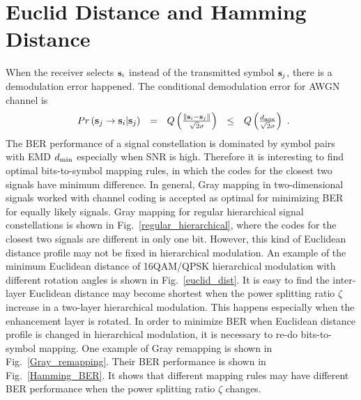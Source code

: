\documentclass[10pt,fleqn, twocolumn]{IEEEtran}
\newcommand{\bs}{{\bf s}}
\begin{document}
\section{Euclid Distance and Hamming Distance}
When the receiver selects $\bs_i$ instead of the transmitted
symbol $\bs_j$, there is a demodulation error happened. The
conditional demodulation error for AWGN channel is
\begin{equation}
\begin{array}{rcccl}
Pr\left(\bs_{j}\rightarrow\bs_{i}|\bs_{j}\right)&=&Q\left(\frac{\|\bs_{i}-\bs_{j}\|}{\sqrt{2}\sigma}\right)&\leq&Q\left(\frac{d_{\rm
min}}{\sqrt{2}\sigma}\right)
\end{array}.\label{prior_error}
\end{equation}
\noindent The BER performance of a signal constellation is
dominated by symbol pairs with EMD $d_{\rm min}$ especially when
SNR is high. Therefore it is interesting to find optimal
bits-to-symbol mapping rules, in which the codes for the closest
two signals have minimum difference. In general, Gray mapping in
two-dimensional signals worked with channel coding is accepted as
optimal for minimizing BER for equally likely signals. Gray
mapping for regular hierarchical signal constellations is shown in
Fig.~\ref{regular_hierarchical}, where the codes for the closest
two signals are different in only one bit.  However, this kind of
Euclidean distance profile may not be fixed in hierarchical
modulation. An example of the minimum Euclidean distance of
16QAM/QPSK hierarchical modulation with different rotation angles
is shown in Fig.~\ref{euclid_dist}. It is easy to find the
inter-layer Euclidean distance may become shortest when the power
splitting ratio $\zeta$ increase in a two-layer hierarchical
modulation. This happens especially when the enhancement layer is
rotated. In order to minimize BER when Euclidean distance profile
is changed in hierarchical modulation, it is necessary to re-do
bits-to-symbol mapping. One example of Gray remapping is shown in
Fig.~\ref{Gray_remapping}. Their BER performance is shown in
Fig.~\ref{Hamming_BER}. It shows that different mapping rules may
have different BER performance when the power splitting ratio
$\zeta$ changes.
\begin{figure}
\end{figure}
\begin{figure}
\end{figure}
\end{document}
